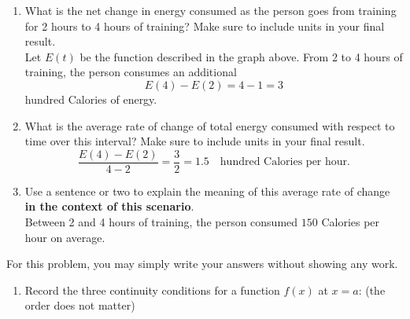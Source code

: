 \documentclass[11pt]{article}
\begin{document}
\begin{enumerate}
\begin{center}
\begin{tikzpicture}[scale=0.9]
\end{tikzpicture}
\end{center}



\begin{enumerate}
    \item What is the net change in energy consumed as the person goes from training for
    2 hours to 4 hours of training? Make sure to include units in your final result.\\[1cm]
    {\color{blue}
    Let $E(t)$ be the function described in the graph above.
    From 2 to 4 hours of training, the person consumes an additional \[E(4) - E(2) = 4 - 1 = 3\] hundred Calories of energy.
    }

    \vfill

    \item What is the average rate of change of total energy consumed with respect to time
    over this interval? Make sure to include units in your final result.\\[1cm]
    {\color{blue}
    \[
        \frac{E(4) - E(2)}{4-2} = \frac{3}{2} = 1.5 \quad \text{hundred Calories per hour.}
    \]
    }
    \vfill

    \item Use a sentence or two to explain the meaning of this average rate of change
    \textbf{in the context of this scenario}.\\[1cm]
    {\color{blue}
    Between 2 and 4 hours of training, the person consumed $150$ Calories per hour  on average.
    }
    

    \vfill
\end{enumerate}




\newpage


For this problem, you may simply write your answers without showing any work.

\begin{enumerate}
    \item[(a)] Record the three continuity conditions for a function \(f(x)\) at \(x = a\):
    {\color{blue} (the order does not matter)}\\


\end{enumerate}
\end{enumerate}
\end{document}
